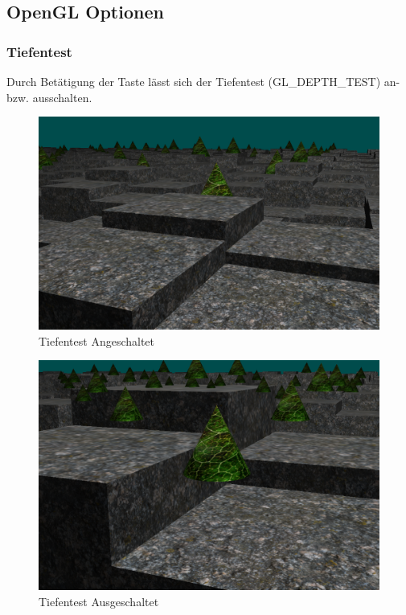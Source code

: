\documentclass{article}
\begin{document}
\subsection{OpenGL Optionen}
\subsubsection{Tiefentest}
Durch Betätigung der Taste  lässt sich der Tiefentest (GL\_DEPTH\_TEST)
an- bzw. ausschalten.
\begin{minipage}{0.5\textwidth}
\begin{figure}[H]
    \includegraphics[scale=0.152]{omode1.png}
    \caption{Tiefentest Angeschaltet}
\end{figure}
\end{minipage}
\begin{minipage}{0.5\textwidth}
\begin{figure}[H]
    \includegraphics[scale=0.178]{omode2.png}
    \caption{Tiefentest Ausgeschaltet}
\end{figure}
\end{minipage}
\end{document}
